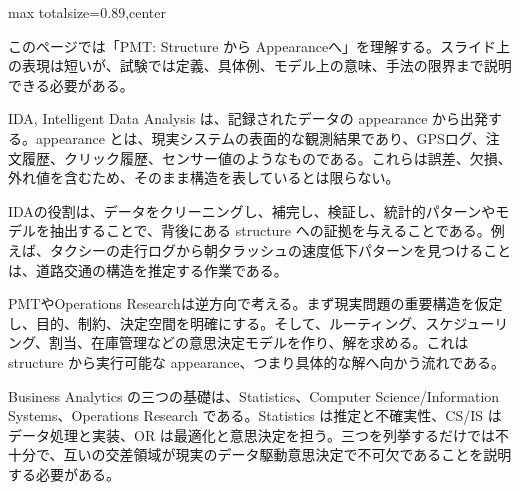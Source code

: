\begin{minipage}[t]{0.58\textwidth}
\begin{adjustbox}{max totalsize={\textwidth}{0.89\textheight},center}
\begin{minipage}{\textwidth}\scriptsize
{}このページでは「PMT: Structure から Appearanceへ」を理解する。スライド上の表現は短いが、試験では定義、具体例、モデル上の意味、手法の限界まで説明できる必要がある。\par
IDA, Intelligent Data Analysis は、記録されたデータの appearance から出発する。appearance とは、現実システムの表面的な観測結果であり、GPSログ、注文履歴、クリック履歴、センサー値のようなものである。これらは誤差、欠損、外れ値を含むため、そのまま構造を表しているとは限らない。\par
IDAの役割は、データをクリーニングし、補完し、検証し、統計的パターンやモデルを抽出することで、背後にある structure への証拠を与えることである。例えば、タクシーの走行ログから朝夕ラッシュの速度低下パターンを見つけることは、道路交通の構造を推定する作業である。\par
PMTやOperations Researchは逆方向で考える。まず現実問題の重要構造を仮定し、目的、制約、決定空間を明確にする。そして、ルーティング、スケジューリング、割当、在庫管理などの意思決定モデルを作り、解を求める。これは structure から実行可能な appearance、つまり具体的な解へ向かう流れである。\par
Business Analytics の三つの基礎は、Statistics、Computer Science/Information Systems、Operations Research である。Statistics は推定と不確実性、CS/IS はデータ処理と実装、OR は最適化と意思決定を担う。三つを列挙するだけでは不十分で、互いの交差領域が現実のデータ駆動意思決定で不可欠であることを説明する必要がある。\par

\end{minipage}
\end{adjustbox}
\end{minipage}
